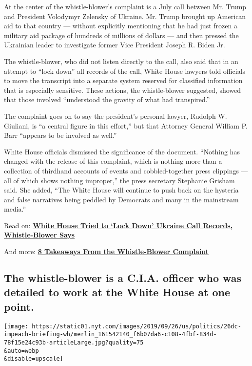 At the center of the whistle-blower's complaint is a July call between
Mr. Trump and President Volodymyr Zelensky of Ukraine. Mr. Trump brought
up American aid to that country --- without explicitly mentioning that
he had just frozen a military aid package of hundreds of millions of
dollars --- and then pressed the Ukrainian leader to investigate former
Vice President Joseph R. Biden Jr.

The whistle-blower, who did not listen directly to the call, also said
that in an attempt to ``lock down'' all records of the call, White House
lawyers told officials to move the transcript into a separate system
reserved for classified information that is especially sensitive. These
actions, the whistle-blower suggested, showed that those involved
``understood the gravity of what had transpired.''

The complaint goes on to say the president's personal lawyer, Rudolph W.
Giuliani, is ``a central figure in this effort,'' but that Attorney
General William P. Barr ``appears to be involved as well.''

White House officials dismissed the significance of the document.
``Nothing has changed with the release of this complaint, which is
nothing more than a collection of thirdhand accounts of events and
cobbled-together press clippings --- all of which shows nothing
improper,'' the press secretary Stephanie Grisham said. She added, ``The
White House will continue to push back on the hysteria and false
narratives being peddled by Democrats and many in the mainstream
media.''

Read on:
\textbf{\href{https://www.nytimes.com/2019/09/26/us/politics/whistleblower-complaint-released.html}{White
House Tried to `Lock Down' Ukraine Call Records, Whistle-Blower Says}}

And more:
\textbf{\href{https://www.nytimes.com/2019/09/26/us/politics/whistleblower-declassified-report.html}{8
Takeaways From the Whistle-Blower Complaint}}

\hypertarget{the-whistle-blower-is-a-cia-officer-who-was-detailed-to-work-at-the-white-house-at-one-point}{%
\subsection{The whistle-blower is a C.I.A. officer who was detailed to
work at the White House at one
point.}\label{the-whistle-blower-is-a-cia-officer-who-was-detailed-to-work-at-the-white-house-at-one-point}}

\texttt{[image: https://static01.nyt.com/images/2019/09/26/us/politics/26dc-impeach-briefing-wh/merlin\_161542140\_f6b07da6-c108-4fbf-834d-78f15e24c93b-articleLarge.jpg?quality=75\\\&auto=webp\\\&disable=upscale]}


